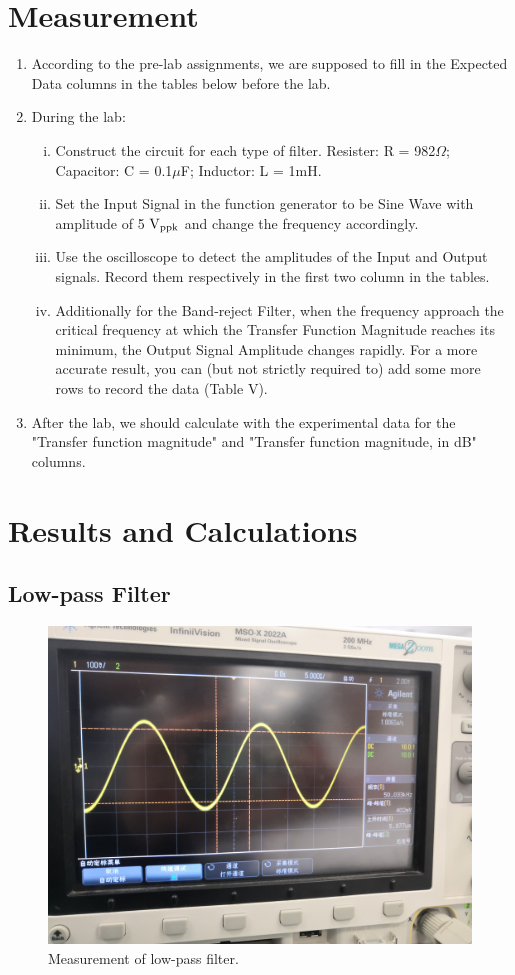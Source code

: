 \documentclass[a4paper]{report}
\begin{document}
\section{Measurement}
\begin{enumerate}[1.]
	\item According to the pre-lab assignments, we are supposed to fill in the Expected Data columns in the tables below before the lab.
	\item During the lab:
	\begin{enumerate}[i)]
		\item Construct the circuit for each type of filter. Resister: R = 982$\Omega$; Capacitor: C = 0.1$\mu$F; Inductor: L = 1mH.
		\item Set the Input Signal in the function generator to be Sine Wave with amplitude of 5 $\rm{V_{ppk}}$ and change the frequency accordingly.
		\item Use the oscilloscope to detect the amplitudes of the Input and Output signals. Record them respectively in the first two column in the tables.
		\item Additionally for the Band-reject Filter, when the frequency approach the critical frequency at which the Transfer Function Magnitude reaches its minimum, the Output Signal Amplitude changes rapidly. For a more accurate result, you can (but not strictly required to) add some more rows to record the data (Table V).
	\end{enumerate}
	\item After the lab, we should calculate with the experimental data for the "Transfer function magnitude" and "Transfer function magnitude, in dB" columns.
\end{enumerate}
\section{Results and Calculations}
\subsection{Low-pass Filter}

\begin{figure}[H]
	\centering
	\includegraphics[width=0.8\linewidth]{9.jpg}
	\caption{Measurement of low-pass filter.}
\end{figure}
\end{document}
